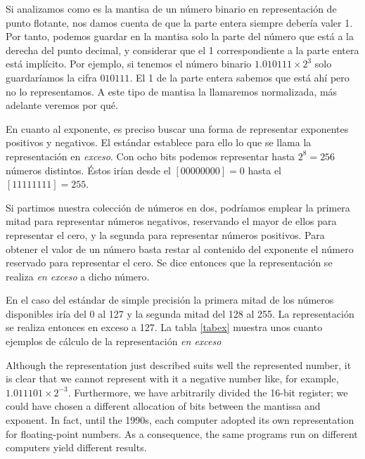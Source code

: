 \begin{paracol}{2}
Si analizamos como es la mantisa de un número binario en representación de punto flotante, nos damos cuenta de que la parte entera siempre debería valer 1. Por tanto, podemos guardar en la mantisa solo la parte del número que está a la derecha del punto decimal, y considerar que el  1 correspondiente a la parte entera está implícito. Por ejemplo, si tenemos el número binario $1.010111\times 2^{3}$ solo guardaríamos la cifra $010111$. El 1 de la parte entera sabemos que está ahí pero no lo representamos. A este tipo de mantisa la llamaremos normalizada, más adelante veremos por qué.

 En cuanto al exponente, es preciso buscar una forma de representar exponentes positivos y negativos. El estándar establece para ello lo que se llama la representación en \emph{exceso}. Con ocho bits podemos representar hasta $2^8=256$ números distintos. Éstos irían desde el $[00000000]=0$ hasta el $[11111111]=255$. 

Si partimos nuestra colección de números en dos, podríamos emplear la primera mitad para representar números negativos, reservando el mayor de ellos para representar el cero, y la segunda para representar números positivos. Para obtener el valor de un número basta restar al contenido del exponente el número reservado para representar el cero. Se dice entonces que la representación se realiza \emph{en exceso} a dicho número.

En el caso del estándar de simple precisión la primera mitad de los números disponibles iría del 0 al 127 y la segunda mitad del 128 al 255. La representación se realiza entonces en exceso a 127. La tabla \ref{tabex} muestra unos cuanto ejemplos de cálculo de la representación \emph{en exceso}

\switchcolumn
Although the representation just described suits well the represented number, it is clear that we cannot represent with it a negative number like, for example, $1.011101\times 2^{-3}$. Fur\-thermore, we have arbitrarily divided the 16-bit register; we could have chosen a different allocation of bits between the mantissa and exponent. In fact, until the 1990s, each computer adopted its own representation for float\-ing-point numbers. As a consequence, the same programs run on different computers yield different results.


\end{paracol}
